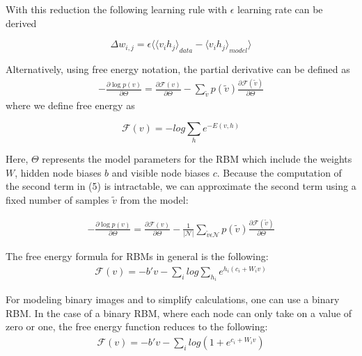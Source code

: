 \documentclass[journal]{IEEEtran}
\begin{document}
With this reduction the following learning rule with $\epsilon$ learning rate can be derived

\begin{equation}
\Delta w_{i,j} = \epsilon\langle{\langle v_{i} h_{j} \rangle}_{data} - {\langle v_{i} h_{j} \rangle}_{model}\rangle 
\end{equation} 

Alternatively, using free energy notation, the partial derivative can be defined as
\begin{equation}
\begin{aligned}
- \frac{\partial \log p(v)}{\partial \Theta} = \frac{\partial \mathcal{F}(v)}{\partial \Theta} - \sum\limits_{\tilde{v}}p(\tilde{v}) \frac{\partial \mathcal{F}(\tilde{v})}{\partial \Theta}
\end{aligned}
\end{equation} where we define free energy as 

\begin{equation}
\mathcal{F}(v) = -log \sum\limits_{h}e^{-E(v,h)}
\end{equation} 

Here, $\Theta$ represents the model parameters for the RBM which include the weights $W$, hidden node biases $b$ and visible node biases $c$. Because the computation of the second term in (5) is intractable, we can approximate the second term using a fixed number of samples $\tilde{v}$ from the model:

\begin{equation}
\begin{aligned}
- \frac{\partial \log p(v)}{\partial \Theta} = \frac{\partial \mathcal{F}(v)}{\partial \Theta} -\frac{1}{|\mathcal{N}|} \sum\limits_{\tilde{v} \epsilon \mathcal{N}} p(\tilde{v}) \frac{\partial \mathcal{F}(\tilde{v})}{\partial \Theta}
\end{aligned}
\end{equation}

The free energy formula for RBMs in general is the following:
\begin{equation}
\begin{aligned}
\mathcal{F}(v) = -b'v - \sum\limits_{i}log\sum\limits_{h_{i}}e^{h_{i}(c_{i}+W_{i}v)}
\end{aligned}
\end{equation}

For modeling binary images and to simplify calculations, one can use a binary RBM. In the case of a binary RBM, where each node can only take on a value of zero or one, the free energy function reduces to the following:
\begin{equation}
\begin{aligned}
\mathcal{F}(v) = -b'v - \sum\limits_{i}log(1 + e^{c_{i}+W_{i}v})
\end{aligned}
\end{equation}
\end{document}
